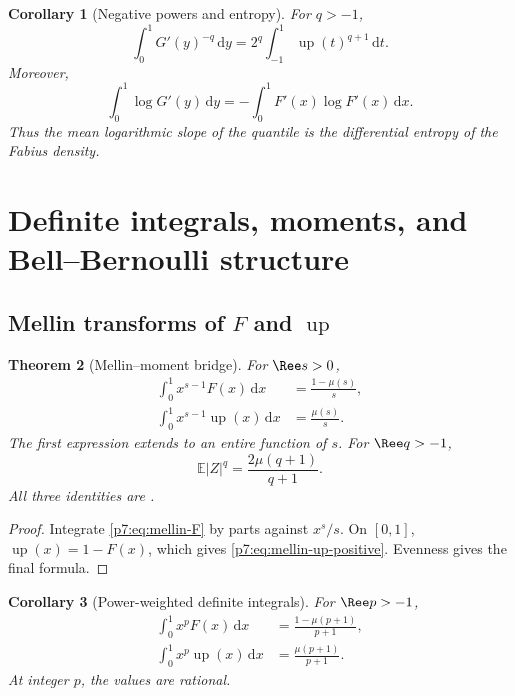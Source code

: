 \documentclass[11pt,oneside]{article}
\newtheorem{theorem}{Theorem}[section]
\newtheorem{corollary}[theorem]{Corollary}
\theoremstyle{definition}
\theoremstyle{remark}
\newcommand{\Up}{\operatorname{up}}
\newcommand{\E}{\mathbb E}
\newcommand{\dd}{\,\mathrm d}
\newcommand{\1}{\mathbf 1}
\begin{document}
\begin{corollary}[Negative powers and entropy]
For $q>-1$,
\begin{equation}
 \int_0^1G'(y)^{-q}\dd y
 =2^q\int_{-1}^{1}\Up(t)^{q+1}\dd t.
 \label{p7:eq:inverse-negative-slope}
\end{equation}
Moreover,
\begin{equation}
 \int_0^1\log G'(y)\dd y
 =-\int_0^1F'(x)\log F'(x)\dd x.
 \label{p7:eq:inverse-entropy}
\end{equation}
Thus the mean logarithmic slope of the quantile is the differential entropy of the Fabius
density.
\end{corollary}

\section{Definite integrals, moments, and Bell--Bernoulli structure}
\label{p7:sec:definite}

\subsection{Mellin transforms of $F$ and $\Up$}

\begin{theorem}[Mellin--moment bridge]
\label{p7:thm:mellin-F}
For $\Ree s>0$,
\begin{align}
 \int_0^1x^{s-1}F(x)\dd x
 &=\frac{1-\mu(s)}s,\label{p7:eq:mellin-F}\\
 \int_0^1x^{s-1}\Up(x)\dd x
 &=\frac{\mu(s)}s.\label{p7:eq:mellin-up-positive}
\end{align}
The first expression extends to an entire function of $s$.  For $\Ree q>-1$,
\begin{equation}
 \E|Z|^q=\frac{2\mu(q+1)}{q+1}.
 \label{p7:eq:absolute-Z-moment}
\end{equation}
All three identities are \statusproved.
\end{theorem}

\begin{proof}
Integrate \cref{p7:eq:mellin-F} by parts against $x^s/s$.  On $[0,1]$,
$\Up(x)=1-F(x)$, which gives \cref{p7:eq:mellin-up-positive}.  Evenness gives the final formula.
\end{proof}

\begin{corollary}[Power-weighted definite integrals]
For $\Ree p>-1$,
\begin{align}
 \int_0^1x^pF(x)\dd x
 &=\frac{1-\mu(p+1)}{p+1},\label{p7:eq:F-power-definite}\\
 \int_0^1x^p\Up(x)\dd x
 &=\frac{\mu(p+1)}{p+1}.\label{p7:eq:up-power-definite}
\end{align}
At integer $p$, the values are rational.
\end{corollary}
\end{document}
